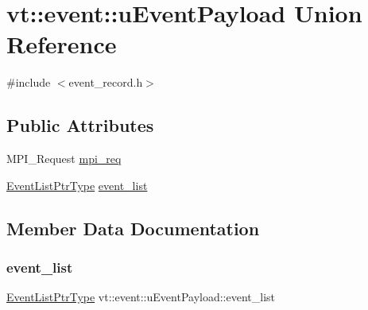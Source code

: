 \hypertarget{unionvt_1_1event_1_1u_event_payload}{}\section{vt\+:\+:event\+:\+:u\+Event\+Payload Union Reference}
\label{unionvt_1_1event_1_1u_event_payload}


{\ttfamily \#include $<$event\+\_\+record.\+h$>$}

\subsection*{Public Attributes}
\begin{DoxyCompactItemize}
\item 
M\+P\+I\+\_\+\+Request \hyperlink{unionvt_1_1event_1_1u_event_payload_a36fd9f8a09add70a3379f3e646cc5b27}{mpi\+\_\+req}
\item 
\hyperlink{namespacevt_1_1event_aa507caad8ea8ee959ccef2d57753dceb}{Event\+List\+Ptr\+Type} \hyperlink{unionvt_1_1event_1_1u_event_payload_a1b6f1d27b5e4442788a9e9ca04446a14}{event\+\_\+list}
\end{DoxyCompactItemize}


\subsection{Member Data Documentation}
\mbox{\label{unionvt_1_1event_1_1u_event_payload_a1b6f1d27b5e4442788a9e9ca04446a14}} 
\subsubsection{\texorpdfstring{event\+\_\+list}{event\_list}}
{\footnotesize\ttfamily \hyperlink{namespacevt_1_1event_aa507caad8ea8ee959ccef2d57753dceb}{Event\+List\+Ptr\+Type} vt\+::event\+::u\+Event\+Payload\+::event\+\_\+list}

\mbox{\label{unionvt_1_1event_1_1u_event_payload_a36fd9f8a09add70a3379f3e646cc5b27}} 
